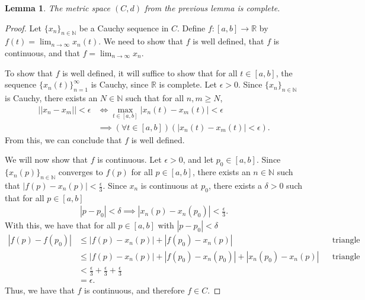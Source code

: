 \documentclass[10pt,a4paper]{article}
\theoremstyle{theorem}
\newtheorem{lemma}{Lemma}
\theoremstyle{definition}
\begin{document}
\begin{lemma}
The metric space $(C, d)$ from the previous lemma is complete.
\end{lemma}

\begin{proof}
Let $\{x_n\}_{n \in \mathbb{N}}$ be a Cauchy sequence in $C$.  Define $f:[a, b] \to \mathbb{R}$ by $f(t) = \lim_{n \to \infty} x_n(t)$. We need to show that $f$ is well defined, that $f$ is continuous, and that $f = \lim_{n \to \infty} x_n$.

To show that $f$ is well defined, it will suffice to show that for all $t \in [a, b]$, the sequence $\{x_n(t) \}_{n=1}^\infty$ is Cauchy, since $\mathbb{R}$ is complete. Let $\epsilon > 0$. Since $\{x_n\}_{n \in \mathbb{N}}$ is Cauchy, there exists an $N \in \mathbb{N}$ such that for all $n, m \geq N$,
\begin{align*}
||x_n - x_m|| < \epsilon &\iff \max_{t \in [a, b]} |x_n(t) - x_m(t)| < \epsilon\\
&\implies (\forall t \in [a, b])(|x_n(t) - x_m(t)| < \epsilon).
\end{align*}
From this, we can conclude that $f$ is well defined.

We will now show that $f$ is continuous. Let $\epsilon >0$, and let $p_0 \in [a, b]$. Since $\{x_n(p)\}_{n \in \mathbb{N}}$ converges to $f(p)$ for all $p \in [a, b]$, there exists an $n \in \mathbb{N}$ such that $|f(p) - x_{n}(p)| < \frac{\epsilon}{3}$. Since $x_n$ is continuous at $p_0$, there exists a $\delta > 0$ such that for all $p \in [a, b]$
\begin{align*}
|p - p_0| < \delta \implies |x_n(p) - x_n(p_0)| < \frac{\epsilon}{3}.
\end{align*} 
With this, we have that for all $p \in [a, b]$ with $|p - p_0| < \delta$
\begin{align*}
|f(p) - f(p_0)| &\leq |f(p) - x_{n}(p)| + |f(p_0) - x_{n}(p)| &&\text{triangle inequality}\\
&\leq |f(p) - x_{n}(p)| + |f(p_0) - x_{n}(p_0)| + |x_n(p_0) - x_{n}(p)| &&\text{triangle inequality} \\
&< \frac{\epsilon}{3} + \frac{\epsilon}{3} + \frac{\epsilon}{3}\\
&= \epsilon.
\end{align*}
Thus, we have that $f$ is continuous, and therefore $f \in C$.


\end{proof}
\end{document}
